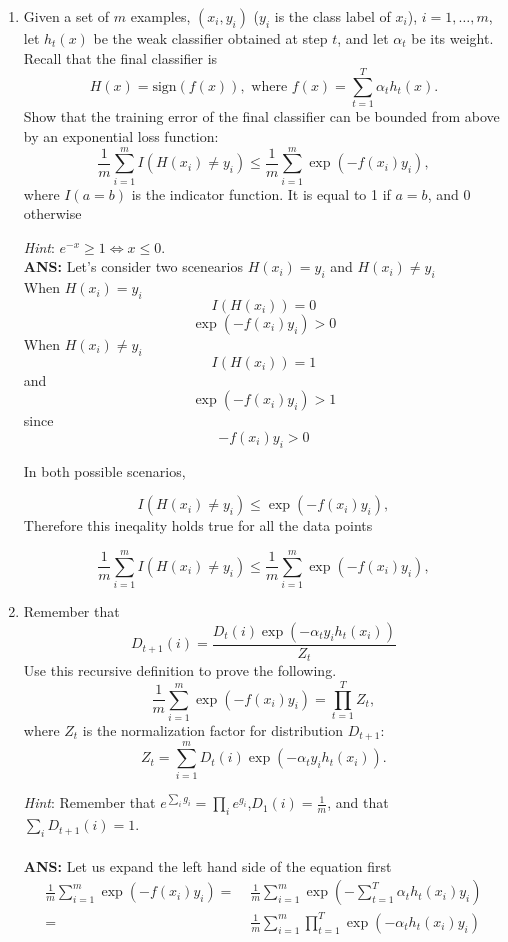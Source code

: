 \documentclass[english]{article}
\begin{document}
\begin{enumerate}
\item Given a set of $m$ examples, $(x_i,y_i)$ ($y_i$ is
  the class label of $x_i$), $i=1,\ldots,m$, let $h_t(x)$ be the weak
  classifier obtained at step $t$, and let $\alpha_t$ be its
  weight. Recall that the final classifier is
  \[
  H(x) = \mbox{sign} (f(x)), \mbox{ where } f(x) = \sum_{t=1}^T
  \alpha_t h_t(x).
  \]
  Show that the training error of the final classifier can be bounded
  from above by an exponential loss function:
  \[
  \frac{1}{m} \sum_{i=1}^m I(H(x_i) \neq y_i) \leq \frac{1}{m}
  \sum_{i=1}^m \exp( -f(x_i) y_i),
  \]
  where $I(a=b)$ is the indicator function. It is equal to 1 if $a=b$,
  and 0 otherwise

  {\em Hint}: $e^{-x} \geq 1 \Leftrightarrow x \leq 0$. 
\\
{\bf ANS: } Let's consider two scenearios $H(x_i) = y_i$ and $H(x_i) \neq y_i$
\\
When $H(x_i) = y_i$
\[I(H(x_i)) = 0\]
\[\exp(-f(x_i)y_i) > 0 \]
When $H(x_i) \neq y_i$
\[I(H(x_i)) = 1\]
and
\[\exp(-f(x_i)y_i) > 1\]
since 
\[-f(x_i)y_i > 0\]

In both possible scenarios, 

\[
  I(H(x_i) \neq y_i) \leq  \exp( -f(x_i) y_i),
  \]
Therefore this ineqality holds true for all the data points

\[
  \frac{1}{m} \sum_{i=1}^m I(H(x_i) \neq y_i) \leq \frac{1}{m}
  \sum_{i=1}^m \exp( -f(x_i) y_i),
  \]

\item 
  Remember that
  \[D_{t+1}(i)=\frac{D_t(i)\exp(-\alpha_ty_ih_t(x_i))}{Z_t}\] Use this
  recursive definition to prove the following.
  \begin{equation}
    \label{boosting:upper bound} \frac{1}{m} \sum_{i=1}^m \exp( -f(x_i)
    y_i) = \prod_{t=1}^T Z_t,
  \end{equation}
  where $Z_t$ is the normalization factor for distribution $D_{t+1}$:
  \begin{equation}
    \label{boosting:normalization_expression} Z_t = \sum_{i=1}^m D_t(i)
    \exp(-\alpha_t y_i h_t(x_i)).
  \end{equation}

  {\em Hint}: Remember that $e^{\sum_i g_i}=\prod_i
  e^{g_i}$,$D_1(i)=\frac{1}{m}$, and that $\sum_i D_{t+1}(i) = 1$.
\\\\
{\bf ANS: } Let us expand the left hand side of the equation first
\begin{align*}
\frac{1}{m} \sum_{i = 1}^m \exp(-f(x_i)y_i) =&\;
\frac{1}{m} \sum_{i = 1}^m \exp(-\sum_{t=1}^T \alpha_t h_t(x_i)y_i)\\
 =&\; \frac{1}{m} \sum_{i = 1}^m \prod_{t=1}^T \exp(-\alpha_t h_t(x_i) y_i)
\end{align*}


\end{enumerate}
\end{document}
